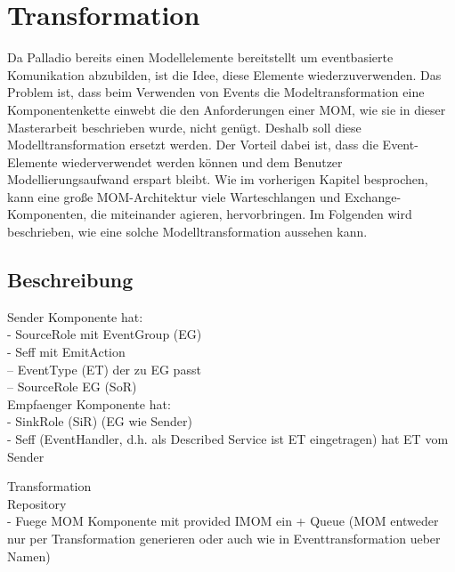 
\chapter{Transformation}
\label{ch:transformation}
Da Palladio bereits einen Modellelemente bereitstellt um eventbasierte Komunikation abzubilden, ist die Idee, diese Elemente wiederzuverwenden. Das Problem ist, dass beim Verwenden von Events die Modeltransformation eine Komponentenkette einwebt die den Anforderungen einer MOM, wie sie in dieser Masterarbeit beschrieben wurde, nicht genügt. Deshalb soll diese Modelltransformation ersetzt werden. Der Vorteil dabei ist, dass die Event-Elemente wiederverwendet werden können und dem Benutzer Modellierungsaufwand erspart bleibt. Wie im vorherigen Kapitel besprochen, kann eine große MOM-Architektur viele Warteschlangen und Exchange-Komponenten, die miteinander agieren, hervorbringen. Im Folgenden wird beschrieben, wie eine solche Modelltransformation aussehen kann.

\section{Beschreibung}
Sender Komponente hat:\\
- SourceRole mit EventGroup (EG)\\
- Seff mit EmitAction\\
-- EventType (ET) der zu EG passt\\
-- SourceRole EG (SoR) \\

Empfaenger Komponente hat:\\
- SinkRole (SiR) (EG wie Sender)\\
- Seff (EventHandler, d.h. als Described Service ist ET eingetragen) hat ET vom Sender


Transformation\\
Repository\\
- Fuege MOM Komponente mit provided IMOM ein + Queue
(MOM entweder nur per Transformation generieren oder auch wie in Eventtransformation ueber Namen)

